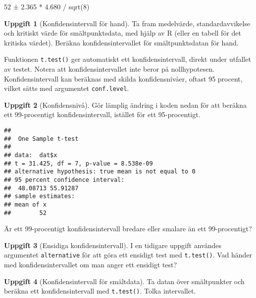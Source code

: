 \documentclass[
]{book}
\newenvironment{Shaded}{\begin{snugshade}}{\end{snugshade}}
\newcommand{\AttributeTok}[1]{\textcolor[rgb]{0.77,0.63,0.00}{#1}}
\newcommand{\FloatTok}[1]{\textcolor[rgb]{0.00,0.00,0.81}{#1}}
\newcommand{\FunctionTok}[1]{\textcolor[rgb]{0.00,0.00,0.00}{#1}}
\newcommand{\NormalTok}[1]{#1}
\newcommand{\SpecialCharTok}[1]{\textcolor[rgb]{0.00,0.00,0.00}{#1}}
\theoremstyle{definition}
\theoremstyle{definition}
\theoremstyle{definition}
\newtheorem{exercise}{Uppgift}[chapter]
\theoremstyle{definition}
\theoremstyle{remark}
\begin{document}
52 ± 2.365 * 4.680 / sqrt(8)

\begin{exercise}[Konfidensintervall för hand]
Ta fram medelvärde, standardavvikelse och kritiskt värde för smältpunktsdata, med hjälp av R (eller en tabell för det kritiska värdet). Beräkna konfidensintervallet för smältpunktsdatan för hand.
\end{exercise}

Funktionen \texttt{t.test()} ger automatiskt ett konfidensintervall, direkt under utfallet av testet. Notera att konfidensintervallet inte beror på nollhypotesen. Konfidensintervall kan beräknas med skilda konfidensnivåer, oftast 95 procent, vilket sätts med argumentet \texttt{conf.level}.

\begin{exercise}[Konfidensnivå]
Gör lämplig ändring i koden nedan för att beräkna ett 99-procentigt konfidensintervall, istället för ett 95-procentigt.

\begin{Shaded}
\end{Shaded}

\begin{verbatim}
## 
##  One Sample t-test
## 
## data:  dat$x
## t = 31.425, df = 7, p-value = 8.538e-09
## alternative hypothesis: true mean is not equal to 0
## 95 percent confidence interval:
##  48.08713 55.91287
## sample estimates:
## mean of x 
##        52
\end{verbatim}

Är ett 99-procentigt konfidensintervall bredare eller smalare än ett 99-procentigt?
\end{exercise}

\begin{exercise}[Ensidiga konfidensintervall]
I en tidigare uppgift användes argumentet \texttt{alternative} för att göra ett ensidigt test med \texttt{t.test()}. Vad händer med konfidensintervallet om man anger ett ensidigt test?
\end{exercise}

\begin{exercise}[Konfidensintervall för smältdata]
Ta datan över smältpunkter och beräkna ett konfidensintervall med \texttt{t.test()}. Tolka intervallet.
\end{exercise}
\end{document}
